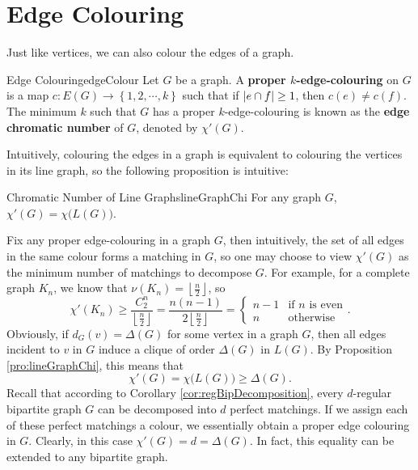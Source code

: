 \documentclass[math]{amznotes}
\theoremstyle{remark}
\newcommand{\0}{\mathbf{0}}
\newcommand{\1}{\mathbf{1}}
\begin{document}
\section{Edge Colouring}
Just like vertices, we can also colour the edges of a graph. 
\begin{dfnbox}{Edge Colouring}{edgeColour}
    Let $G$ be a graph. A {\color{red} \textbf{proper $k$-edge-colouring}} on $G$ is a map $c \colon E(G) \to \left\{1, 2, \cdots, k\right\}$ such that if ${\left\lvert {e \cap f} \right\rvert} \geq 1$, then $c(e) \neq c(f)$. The minimum $k$ such that $G$ has a proper $k$-edge-colouring is known as the {\color{red} \textbf{edge chromatic number}} of $G$, denoted by $\chi'(G)$.
\end{dfnbox}
Intuitively, colouring the edges in a graph is equivalent to colouring the vertices in its line graph, so the following proposition is intuitive:
\begin{probox}{Chromatic Number of Line Graphs}{lineGraphChi}
    For any graph $G$, $\chi'(G) = \chi\bigl(L(G)\bigr)$.
\end{probox}
Fix any proper edge-colouring in a graph $G$, then intuitively, the set of all edges in the same colour forms a matching in $G$, so one may choose to view $\chi'(G)$ as the minimum number of matchings to decompose $G$. For example, for a complete graph $K_n$, we know that $\nu(K_n) = \left\lfloor\frac{n}{2}\right\rfloor$, so 
\begin{equation*}
    \chi'(K_n) \geq \frac{C^n_2}{\left\lfloor\frac{n}{2}\right\rfloor} = \frac{n(n - 1)}{2\left\lfloor\frac{n}{2}\right\rfloor} = \begin{cases}
        n - 1 & \textrm{if } n \textrm{ is even} \\
        n & \textrm{otherwise}
    \end{cases}.
\end{equation*}
Obviously, if $d_G(v) = \Delta(G)$ for some vertex in a graph $G$, then all edges incident to $v$ in $G$ induce a clique of order $\Delta(G)$ in $L(G)$. By Proposition \ref{pro:lineGraphChi}, this means that 
\begin{equation*}
    \chi'(G) = \chi\bigl(L(G)\bigr) \geq \Delta(G).
\end{equation*}
Recall that according to Corollary \ref{cor:regBipDecomposition}, every $d$-regular bipartite graph $G$ can be decomposed into $d$ perfect matchings. If we assign each of these perfect matchings a colour, we essentially obtain a proper edge colouring in $G$. Clearly, in this case $\chi'(G) = d = \Delta(G)$. In fact, this equality can be extended to any bipartite graph.
\end{document}
